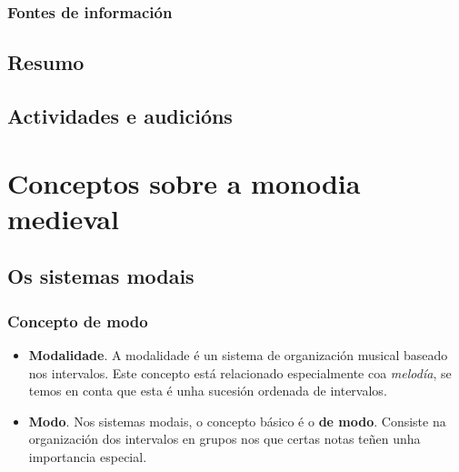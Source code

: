 \documentclass[a4paper, twoside]{templates/ociamthesis}
\begin{document}
\hypertarget{fontes-de-informaciuxf3n}{%
\subsection{Fontes de información}\label{fontes-de-informaciuxf3n}}

\hypertarget{resumo-1}{%
\section*{Resumo}\label{resumo-1}}

\hypertarget{actividades-e-audiciuxf3ns-1}{%
\section*{Actividades e audicións}\label{actividades-e-audiciuxf3ns-1}}

\hypertarget{conceptos-sobre-a-monodia-medieval}{%
\chapter{Conceptos sobre a monodia medieval}\label{conceptos-sobre-a-monodia-medieval}}

\minitoc 

\hypertarget{os-sistemas-modais}{%
\section{Os sistemas modais}\label{os-sistemas-modais}}

\hypertarget{concepto-de-modo}{%
\subsection{Concepto de modo}\label{concepto-de-modo}}

\begin{itemize}
\item
  \textbf{Modalidade}. A modalidade é un sistema de organización musical baseado nos intervalos. Este concepto está relacionado especialmente coa \emph{melodía}, se temos en conta que esta é unha sucesión ordenada de intervalos.
\item
  \textbf{Modo}. Nos sistemas modais, o concepto básico é o \textbf{de modo}. Consiste na organización dos intervalos en grupos nos que certas notas teñen unha importancia especial.
\end{itemize}
\end{document}
